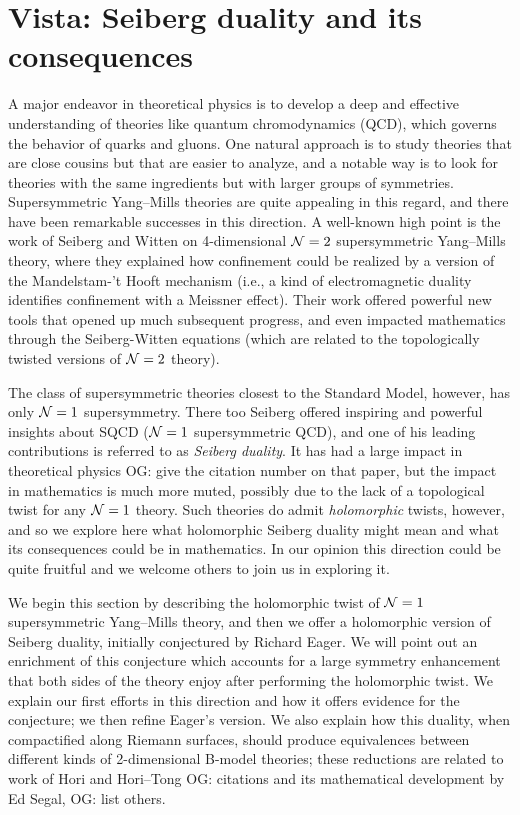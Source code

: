 \documentclass[11pt]{amsart}
\def\owen#1{{\textcolor{violet!65!black}{OG: {#1}}}}
\begin{document}
\section{Vista: Seiberg duality and its consequences}
\label{sec: seiberg}

A major endeavor in theoretical physics is to develop a deep and effective understanding of theories like quantum chromodynamics (QCD), which governs the behavior of quarks and gluons.
One natural approach is to study theories that are close cousins but that are easier to analyze,
and a notable way is to look for theories with the same ingredients but with larger groups of symmetries.
Supersymmetric Yang--Mills theories are quite appealing in this regard,
and there have been remarkable successes in this direction.
A well-known high point is the work of Seiberg and Witten on 4-dimensional $\mathcal N =2$ supersymmetric Yang--Mills theory,
where they explained how confinement could be realized by a version of the Mandelstam-'t Hooft mechanism (i.e., a kind of electromagnetic duality identifies confinement with a Meissner effect).
Their work offered powerful new tools that opened up much subsequent progress,
and even impacted mathematics through the Seiberg-Witten equations (which are related to the topologically twisted versions of $\mathcal N=2$ theory).

The class of supersymmetric theories closest to the Standard Model, however, has only $\mathcal N=1$ supersymmetry.
There too Seiberg offered inspiring and powerful insights about SQCD ($\mathcal N=1$ supersymmetric QCD),
and one of his leading contributions is referred to as {\em Seiberg duality}.
It has had a large impact in theoretical physics \owen{give the citation number on that paper},
but the impact in mathematics is much more muted,
possibly due to the lack of a topological twist for any $\mathcal N=1$ theory.
Such theories do admit {\em holomorphic} twists, however, 
and so we explore here what holomorphic Seiberg duality might mean and what its consequences could be in mathematics.
In our opinion this direction could be quite fruitful and we welcome others to join us in exploring it.

We begin this section by describing the holomorphic twist of $\mathcal N=1$ supersymmetric Yang--Mills theory,
and then we offer a holomorphic version of Seiberg duality, 
initially conjectured by Richard Eager.
We will point out an enrichment of this conjecture which accounts for a large symmetry enhancement that both sides of the theory enjoy after performing the holomorphic twist.
We explain our first efforts in this direction and how it offers evidence for the conjecture;
we then refine Eager's version.
We also explain how this duality, when compactified along Riemann surfaces,
should produce equivalences between different kinds of 2-dimensional B-model theories;
these reductions are related to work of Hori and Hori--Tong \owen{citations} and its mathematical development by Ed Segal, \owen{list others}.
\end{document}

